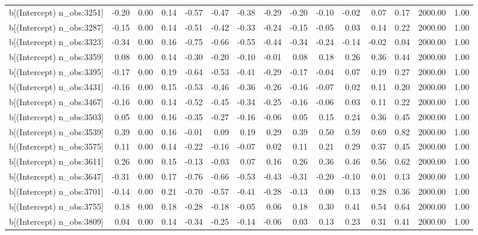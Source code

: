 \begin{table}[ht]
\begin{tabular}{rrrrrrrrrrrrrrr}
  b[(Intercept) n\_obs:3251] & -0.20 & 0.00 & 0.14 & -0.57 & -0.47 & -0.38 & -0.29 & -0.20 & -0.10 & -0.02 & 0.07 & 0.17 & 2000.00 & 1.00 \\ 
  b[(Intercept) n\_obs:3287] & -0.15 & 0.00 & 0.14 & -0.51 & -0.42 & -0.33 & -0.24 & -0.15 & -0.05 & 0.03 & 0.14 & 0.22 & 2000.00 & 1.00 \\ 
  b[(Intercept) n\_obs:3323] & -0.34 & 0.00 & 0.16 & -0.75 & -0.66 & -0.55 & -0.44 & -0.34 & -0.24 & -0.14 & -0.02 & 0.04 & 2000.00 & 1.00 \\ 
  b[(Intercept) n\_obs:3359] & 0.08 & 0.00 & 0.14 & -0.30 & -0.20 & -0.10 & -0.01 & 0.08 & 0.18 & 0.26 & 0.36 & 0.44 & 2000.00 & 1.00 \\ 
  b[(Intercept) n\_obs:3395] & -0.17 & 0.00 & 0.19 & -0.64 & -0.53 & -0.41 & -0.29 & -0.17 & -0.04 & 0.07 & 0.19 & 0.27 & 2000.00 & 1.00 \\ 
  b[(Intercept) n\_obs:3431] & -0.16 & 0.00 & 0.15 & -0.53 & -0.46 & -0.36 & -0.26 & -0.16 & -0.07 & 0.02 & 0.11 & 0.20 & 2000.00 & 1.00 \\ 
  b[(Intercept) n\_obs:3467] & -0.16 & 0.00 & 0.14 & -0.52 & -0.45 & -0.34 & -0.25 & -0.16 & -0.06 & 0.03 & 0.11 & 0.22 & 2000.00 & 1.00 \\ 
  b[(Intercept) n\_obs:3503] & 0.05 & 0.00 & 0.16 & -0.35 & -0.27 & -0.16 & -0.06 & 0.05 & 0.15 & 0.24 & 0.36 & 0.45 & 2000.00 & 1.00 \\ 
  b[(Intercept) n\_obs:3539] & 0.39 & 0.00 & 0.16 & -0.01 & 0.09 & 0.19 & 0.29 & 0.39 & 0.50 & 0.59 & 0.69 & 0.82 & 2000.00 & 1.00 \\ 
  b[(Intercept) n\_obs:3575] & 0.11 & 0.00 & 0.14 & -0.22 & -0.16 & -0.07 & 0.02 & 0.11 & 0.21 & 0.29 & 0.37 & 0.45 & 2000.00 & 1.00 \\ 
  b[(Intercept) n\_obs:3611] & 0.26 & 0.00 & 0.15 & -0.13 & -0.03 & 0.07 & 0.16 & 0.26 & 0.36 & 0.46 & 0.56 & 0.62 & 2000.00 & 1.00 \\ 
  b[(Intercept) n\_obs:3647] & -0.31 & 0.00 & 0.17 & -0.76 & -0.66 & -0.53 & -0.43 & -0.31 & -0.20 & -0.10 & 0.01 & 0.13 & 2000.00 & 1.00 \\ 
  b[(Intercept) n\_obs:3701] & -0.14 & 0.00 & 0.21 & -0.70 & -0.57 & -0.41 & -0.28 & -0.13 & 0.00 & 0.13 & 0.28 & 0.36 & 2000.00 & 1.00 \\ 
  b[(Intercept) n\_obs:3755] & 0.18 & 0.00 & 0.18 & -0.28 & -0.18 & -0.05 & 0.06 & 0.18 & 0.30 & 0.41 & 0.54 & 0.64 & 2000.00 & 1.00 \\ 
  b[(Intercept) n\_obs:3809] & 0.04 & 0.00 & 0.14 & -0.34 & -0.25 & -0.14 & -0.06 & 0.03 & 0.13 & 0.23 & 0.31 & 0.41 & 2000.00 & 1.00 \\ 

\end{tabular}
\end{table}
